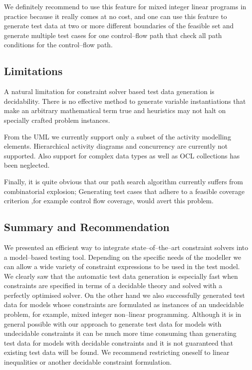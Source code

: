 \documentclass[runningheads,a4paper]{llncs}%
\begin{document}
We definitely recommend to use this feature for mixed integer linear programs in practice because it really comes at no cost, and one can use this feature to generate test data at two or more different boundaries of the feasible set and generate multiple test cases for one control--flow path that check all path conditions for the control--flow path.%
\subsection{Limitations}
A natural limitation for constraint solver based test data generation is decidability. There is no effective method to generate variable instantiations that make an arbitrary mathematical term true and heuristics may not halt on specially crafted problem instances.

From the UML we currently support only a subset of the activity modelling elements. Hierarchical activity diagrams and concurrency are currently not supported. Also support for complex data types as well as OCL collections has been neglected.

Finally, it is quite obvious that our path search algorithm currently suffers from combinatorial explosion; Generating test cases that adhere to a feasible coverage criterion ,for example control flow coverage, would avert this problem.
\subsection{Summary and Recommendation}%
\label{sec:Recommendation}%
We presented an efficient way to integrate state--of--the--art constraint solvers into a model--based testing tool. Depending on the specific needs of the modeller we can allow a wide variety of constraint expressions to be used in the test model. We clearly saw that the automatic test data generation is especially fast when constraints are specified in terms of a decidable theory and solved with a perfectly optimised solver. On the other hand we also successfully generated test data for models whose constraints are formulated as instances of an undecidable problem, for example, mixed integer non--linear programming. Although it is in general possible with our approach to generate test data for models with undecidable constraints it can be much more time consuming than generating test data for models with decidable constraints and it is not guaranteed that existing test data will be found. We recommend restricting oneself to linear inequalities or another decidable constraint formulation.
\end{document}
